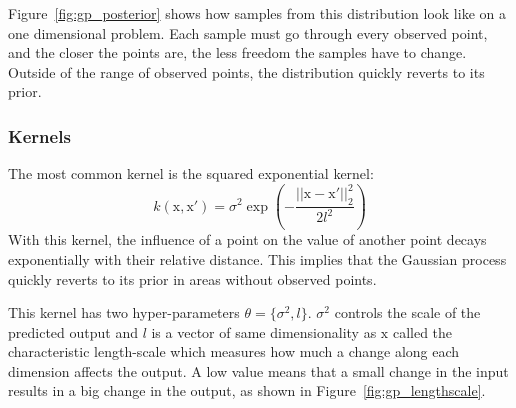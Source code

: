 Figure~\ref{fig:gp_posterior} shows how samples from this distribution look like on a one dimensional problem. Each sample must go through every observed point, and the closer the points are, the less freedom the samples have to change. Outside of the range of observed points, the distribution quickly reverts to its prior. 


\subsubsection{Kernels}

The most common kernel is the squared exponential kernel:
\begin{equation}
	k(\mathrm{x}, \mathrm{x'}) = \sigma^2 \exp\left( -\frac{||\mathrm{x} - \mathrm{x'}||_2^2}{2l^2}\right)
	\label{eq:sqexp}
\end{equation}
With this kernel, the influence of a point on the value of another point decays exponentially with their relative distance. This implies that the Gaussian process quickly reverts to its prior in areas without observed points.

This kernel has two hyper-parameters $\theta = \{ \sigma^2 , l \}$. $\sigma^2$ controls the scale of the predicted output and $l$ is a vector of same dimensionality as $\mathrm{x}$ called the characteristic length-scale which measures how much a change along each dimension affects the output. A low value means that a small change in the input results in a big change in the output, as shown in Figure~\ref{fig:gp_lengthscale}. 

